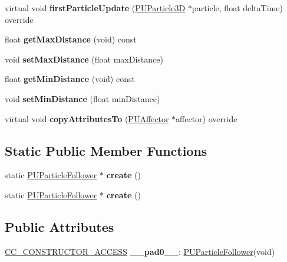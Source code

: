 \begin{DoxyCompactItemize}
\mbox{\label{classPUParticleFollower_abce5a567471bf16d623a29e548635131}} 
virtual void {\bfseries first\+Particle\+Update} (\hyperlink{structPUParticle3D}{P\+U\+Particle3D} $\ast$particle, float delta\+Time) override
\item 
\mbox{\label{classPUParticleFollower_a1c626f1e8ec504b731e0e9e3cea67840}} 
float {\bfseries get\+Max\+Distance} (void) const
\item 
\mbox{\label{classPUParticleFollower_a9f84e902ddc93bbd9a6f0102406966f3}} 
void {\bfseries set\+Max\+Distance} (float max\+Distance)
\item 
\mbox{\label{classPUParticleFollower_aa1965b2589f22f8de8a2839754257aa6}} 
float {\bfseries get\+Min\+Distance} (void) const
\item 
\mbox{\label{classPUParticleFollower_a1bab19e72e519e0330c241fb5e00fa43}} 
void {\bfseries set\+Min\+Distance} (float min\+Distance)
\item 
\mbox{\label{classPUParticleFollower_abc6f2fc55af7eca8f8d91150365d969c}} 
virtual void {\bfseries copy\+Attributes\+To} (\hyperlink{classPUAffector}{P\+U\+Affector} $\ast$affector) override
\end{DoxyCompactItemize}
\subsection*{Static Public Member Functions}
\begin{DoxyCompactItemize}
\item 
\mbox{\label{classPUParticleFollower_ad9f49e1ccd46017a71ec4126b5b6ae29}} 
static \hyperlink{classPUParticleFollower}{P\+U\+Particle\+Follower} $\ast$ {\bfseries create} ()
\item 
\mbox{\label{classPUParticleFollower_a5ac1a7f7165544756ff9470375b6bc2f}} 
static \hyperlink{classPUParticleFollower}{P\+U\+Particle\+Follower} $\ast$ {\bfseries create} ()
\end{DoxyCompactItemize}
\subsection*{Public Attributes}
\begin{DoxyCompactItemize}
\item 
\mbox{\label{classPUParticleFollower_af870661f49ae6f2e614d76f584b65158}} 
\hyperlink{_2cocos2d_2cocos_2base_2ccConfig_8h_a25ef1314f97c35a2ed3d029b0ead6da0}{C\+C\+\_\+\+C\+O\+N\+S\+T\+R\+U\+C\+T\+O\+R\+\_\+\+A\+C\+C\+E\+SS} {\bfseries \+\_\+\+\_\+pad0\+\_\+\+\_\+}\+: \hyperlink{classPUParticleFollower}{P\+U\+Particle\+Follower}(void)
\end{DoxyCompactItemize}
